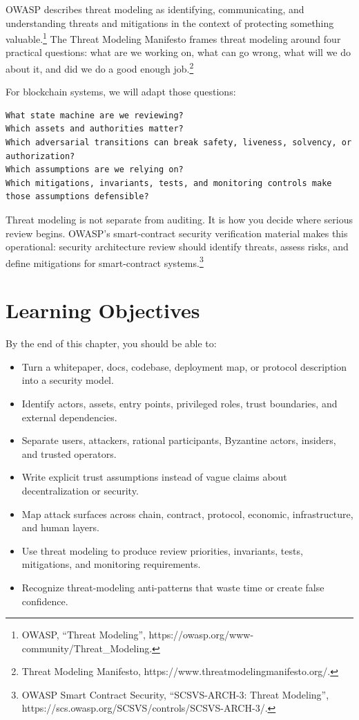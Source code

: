 OWASP describes threat modeling as identifying, communicating, and
understanding threats and mitigations in the context of protecting
something valuable.\footnote{OWASP, ``Threat Modeling'',
  https://owasp.org/www-community/Threat\_Modeling.} The Threat Modeling
Manifesto frames threat modeling around four practical questions: what
are we working on, what can go wrong, what will we do about it, and did
we do a good enough job.\footnote{Threat Modeling Manifesto,
  https://www.threatmodelingmanifesto.org/.}

For blockchain systems, we will adapt those questions:

\begin{lstlisting}
What state machine are we reviewing?
Which assets and authorities matter?
Which adversarial transitions can break safety, liveness, solvency, or authorization?
Which assumptions are we relying on?
Which mitigations, invariants, tests, and monitoring controls make those assumptions defensible?
\end{lstlisting}

Threat modeling is not separate from auditing. It is how you decide
where serious review begins. OWASP's smart-contract security
verification material makes this operational: security architecture
review should identify threats, assess risks, and define mitigations for
smart-contract systems.\footnote{OWASP Smart Contract Security,
  ``SCSVS-ARCH-3: Threat Modeling'',
  https://scs.owasp.org/SCSVS/controls/SCSVS-ARCH-3/.}

\section{Learning Objectives}

By the end of this chapter, you should be able to:

\begin{itemize}
\tightlist
\item
  Turn a whitepaper, docs, codebase, deployment map, or protocol
  description into a security model.
\item
  Identify actors, assets, entry points, privileged roles, trust
  boundaries, and external dependencies.
\item
  Separate users, attackers, rational participants, Byzantine actors,
  insiders, and trusted operators.
\item
  Write explicit trust assumptions instead of vague claims about
  decentralization or security.
\item
  Map attack surfaces across chain, contract, protocol, economic,
  infrastructure, and human layers.
\item
  Use threat modeling to produce review priorities, invariants, tests,
  mitigations, and monitoring requirements.
\item
  Recognize threat-modeling anti-patterns that waste time or create
  false confidence.
\end{itemize}

